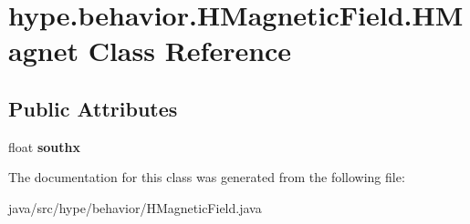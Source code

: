 \hypertarget{classhype_1_1behavior_1_1_h_magnetic_field_1_1_h_magnet}{\section{hype.\-behavior.\-H\-Magnetic\-Field.\-H\-Magnet Class Reference}
\label{classhype_1_1behavior_1_1_h_magnetic_field_1_1_h_magnet}
}
\subsection*{Public Attributes}
\begin{DoxyCompactItemize}
\item 
\hypertarget{classhype_1_1behavior_1_1_h_magnetic_field_1_1_h_magnet_acc4b0424dd876074fbf6ecae703fd484}{float {\bfseries southx}}\label{classhype_1_1behavior_1_1_h_magnetic_field_1_1_h_magnet_acc4b0424dd876074fbf6ecae703fd484}

\end{DoxyCompactItemize}


The documentation for this class was generated from the following file\-:\begin{DoxyCompactItemize}
\item 
java/src/hype/behavior/H\-Magnetic\-Field.\-java\end{DoxyCompactItemize}
